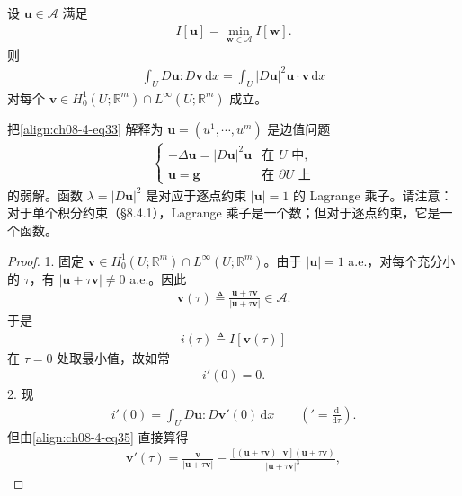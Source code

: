 \documentclass[../../main.tex]{subfiles}
\begin{document}
\begin{theorem}\label{theorem:ch08-4-5-调和映射EL}
设 $\mathbf{u}\in\mathcal{A}$ 满足
\begin{align*}
I[\mathbf{u}]=\min_{\mathbf{w}\in\mathcal{A}}I[\mathbf{w}].
\end{align*}
则
\begin{align}
\int_U D\mathbf{u}:D\mathbf{v}\,\mathrm{d}x=\int_U|D\mathbf{u}|^2\mathbf{u}\cdot\mathbf{v}\,\mathrm{d}x\label{align:ch08-4-eq33}
\end{align}
对每个 $\mathbf{v}\in H_0^1(U;\mathbb{R}^m)\cap L^\infty(U;\mathbb{R}^m)$ 成立。

把\eqref{align:ch08-4-eq33} 解释为 $\mathbf{u}=(u^1,\cdots,u^m)$ 是边值问题
\begin{align}
\begin{cases}
-\Delta\mathbf{u}=|D\mathbf{u}|^2\mathbf{u}&\text{在 }U\text{ 中},\\
\mathbf{u}=\mathbf{g}&\text{在 }\partial U\text{ 上}
\end{cases}\label{align:ch08-4-eq34}
\end{align}
的弱解。函数 $\lambda=|D\mathbf{u}|^2$ 是对应于逐点约束 $|\mathbf{u}|=1$ 的 Lagrange 乘子。请注意：对于单个积分约束（\S8.4.1），Lagrange 乘子是一个数；但对于逐点约束，它是一个函数。
\begin{proof}
1. 固定 $\mathbf{v}\in H_0^1(U;\mathbb{R}^m)\cap L^\infty(U;\mathbb{R}^m)$。由于 $|\mathbf{u}|=1$ a.e.，对每个充分小的 $\tau$，有 $|\mathbf{u}+\tau\mathbf{v}|\neq 0$ a.e.。因此
\begin{align}
\mathbf{v}(\tau)\triangleq\frac{\mathbf{u}+\tau\mathbf{v}}{|\mathbf{u}+\tau\mathbf{v}|}\in\mathcal{A}.\label{align:ch08-4-eq35}
\end{align}
于是
\begin{align*}
i(\tau)\triangleq I[\mathbf{v}(\tau)]
\end{align*}
在 $\tau=0$ 处取最小值，故如常
\begin{align}
i'(0)=0.\label{align:ch08-4-eq36}
\end{align}
2. 现
\begin{align}
i'(0)=\int_U D\mathbf{u}:D\mathbf{v}'(0)\,\mathrm{d}x\qquad ('=\frac{\mathrm{d}}{\mathrm{d}\tau}).\label{align:ch08-4-eq37}
\end{align}
但由\eqref{align:ch08-4-eq35} 直接算得
\begin{align*}
\mathbf{v}'(\tau)=\frac{\mathbf{v}}{|\mathbf{u}+\tau\mathbf{v}|}-\frac{[(\mathbf{u}+\tau\mathbf{v})\cdot\mathbf{v}](\mathbf{u}+\tau\mathbf{v})}{|\mathbf{u}+\tau\mathbf{v}|^3},

\end{align*}
\end{proof}
\end{theorem}
\end{document}
